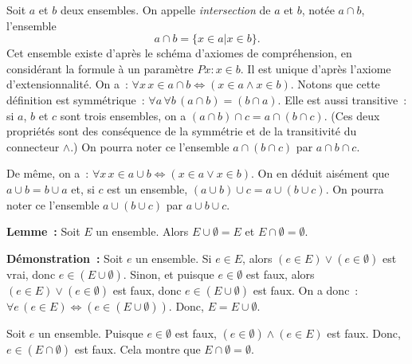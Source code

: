 Soit $a$ et $b$ deux ensembles. 
On appelle \textit{intersection} de $a$ et $b$, notée $a \cap b$, l'ensemble 
\begin{equation*}
    a \cap b = \lbrace x \in a \vert x \in b \rbrace. 
\end{equation*}
Cet ensemble existe d'après le schéma d'axiomes de compréhension, en considérant la formule à un paramètre $P x: x \in b$. 
Il est unique d'après l'axiome d'extensionnalité.
On a : $\forall x \, x \in a \cap b \Leftrightarrow (x \in a \wedge x \in b)$. 
Notons que cette définition est symmétrique : $\forall a \, \forall b \, (a \cap b) = (b \cap a)$.  
Elle est aussi transitive : si $a$, $b$ et $c$ sont trois ensembles, on a $(a \cap b) \cap c = a \cap (b \cap c)$. 
(Ces deux propriétés sont des conséquence de la symmétrie et de la transitivité du connecteur $\wedge$.)
On pourra noter ce l'ensemble $a \cap (b \cap c)$ par $a \cap b \cap c$. 

De même, on a : $\forall x \, x \in a \cup b \Leftrightarrow (x \in a \vee x \in b)$. 
On en déduit aisément que $a \cup b = b \cup a$ et, si $c$ est un ensemble, $(a \cup b) \cup c = a \cup (b \cup c)$. 
On pourra noter ce l'ensemble $a \cup (b \cup c)$ par $a \cup b \cup c$. 

\medskip

\noindent\textbf{Lemme :} Soit $E$ un ensemble. 
    Alors $E \cup \emptyset = E$ et $E \cap \emptyset = \emptyset$.

\medskip

\noindent\textbf{Démonstration :} 
    Soit $e$ un ensemble. 
    Si $e \in E$, alors $(e \in E) \vee (e \in \emptyset)$  est vrai, donc $e \in (E \cup \emptyset)$.
    Sinon, et puisque $e \in \emptyset$ est faux, alors $(e \in E) \vee (e \in \emptyset)$  est faux, donc $e \in (E \cup \emptyset)$ est faux.
    On a donc : $\forall e \, (e \in E) \Leftrightarrow (e \in (E \cup \emptyset))$.
    Donc, $E = E \cup \emptyset$.

    Soit $e$ un ensemble. 
    Puisque $e \in \emptyset$ est faux, $(e \in \emptyset) \wedge (e \in E)$ est faux. 
    Donc, $e \in (E \cap \emptyset)$ est faux.
    Cela montre que $E \cap \emptyset = \emptyset$.

    \done

\medskip

